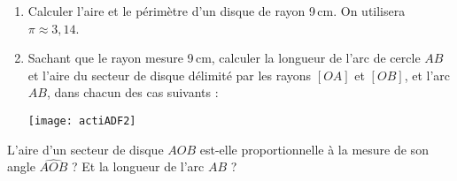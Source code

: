 \begin{activite}

\begin{partie}
\begin{enumerate}
\item Calculer l'aire et le périmètre d'un disque de rayon 9\,cm. On utilisera $\pi \approx 3,14$.
\item Sachant que le rayon mesure 9\,cm, calculer la longueur de l'arc de cercle $AB$ et l'aire du secteur de disque délimité par les rayons $[OA]$ et $[OB]$, et l'arc $AB$, dans chacun des cas suivants :

\texttt{[image: actiADF2]}

\end{enumerate}
\end{partie}

\begin{partie}
L'aire d'un secteur de disque $AOB$ est-elle proportionnelle à la mesure de son angle $\widehat{AOB}$ ? Et la longueur de l'arc $AB$ ?
\end{partie}


\end{activite}
